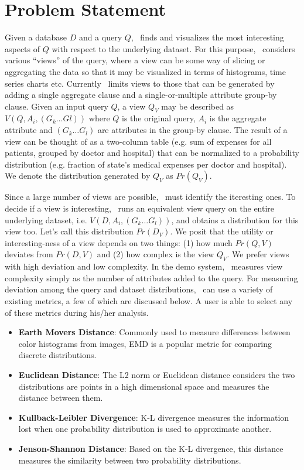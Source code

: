\section{Problem Statement}
\label{sec:problem_statement}

Given a database $D$ and a query $Q$, \SeeDB\ finds and visualizes the most
interesting aspects of $Q$ with respect to the underlying dataset. For this
purpose, \SeeDB\ considers various ``views'' of the query, where a view can be
some way of slicing or aggregating the data so that it may be visualized in
terms of histograms, time series charts etc. Currently \SeeDB\ limits views to
those that can be generated by adding a single aggregate clause and a
single-or-multiple attribute group-by clause. Given an input query $Q$, a view
$Q_V$ may be described as $V(Q, A_i, (G_k\ldots Gl))$ where $Q$ is the original
query, $A_i$ is the aggregate attribute and $(G_k\ldots G_l)$ are attributes in
the group-by clause. The result of a view can be thought of as a two-column
table (e.g. sum of expenses for all patients, grouped by doctor and hospital)
that can be normalized to a probability distribution (e.g.
fraction of state's medical expenses per doctor and hospital). We denote the
distribution generated by $Q_V$ as $Pr(Q_V)$.

Since a large number of views are possible, \SeeDB\ must identify the iteresting
ones. To decide if a view is interesting, \SeeDB\ runs an equivalent view query
on the entire underlying dataset, i.e. $V(D, A_i, (G_k\ldots G_l))$, and obtains
a distribution for this view too. Let's call this distribution $Pr(D_V)$. We
posit that the utility or interesting-ness of a view depends on two things: (1)
how much $Pr(Q, V)$ deviates from $Pr(D, V)$ and (2) how complex is the view
$Q_V$. We prefer views with high deviation and low complexity. In the demo
system, \SeeDB\ measures view complexity simply as the number of attributes
added to the query. For measuring deviation among the query and dataset
distributions, \SeeDB\ can use a variety of existing metrics, a few of which are
discussed below. A user is able to select any of these metrics during his/her
analysis.

\begin{itemize}
  \item {\bf Earth Movers Distance}: Commonly used to measure differences
  between color histograms from images, EMD is a popular metric for comparing
  discrete distributions.
  \item {\bf Euclidean Distance}: The L2 norm or Euclidean distance considers
  the two distributions are points in a high dimensional space and measures the
  distance between them.
  \item {\bf Kullback-Leibler Divergence}: K-L divergence measures the
  information lost when one probability distribution is used to approximate
  another.
  \item {\bf Jenson-Shannon Distance}: Based on the K-L divergence, this
  distance measures the similarity between two probability distributions.
\end{itemize}



